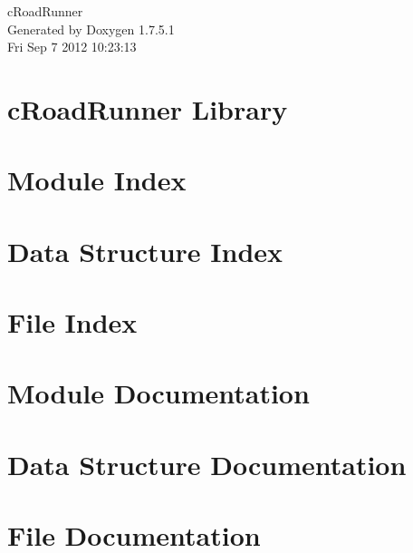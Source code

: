 \documentclass[a4paper]{book}
\begin{document}
\hypersetup{pageanchor=false,citecolor=blue}
\begin{titlepage}
\vspace*{7cm}
\begin{center}
{\Large c\-Road\-Runner }\\
\vspace*{1cm}
{\large \-Generated by Doxygen 1.7.5.1}\\
\vspace*{0.5cm}
{\small Fri Sep 7 2012 10:23:13}\\
\end{center}
\end{titlepage}
\clearemptydoublepage
{}
\tableofcontents
\clearemptydoublepage
{}
\hypersetup{pageanchor=true,citecolor=blue}
\chapter{c\-Road\-Runner \-Library}
\label{index}\hypertarget{index}{}
\chapter{\-Module \-Index}

\chapter{\-Data \-Structure \-Index}

\chapter{\-File \-Index}

\chapter{\-Module \-Documentation}



















\chapter{\-Data \-Structure \-Documentation}










\chapter{\-File \-Documentation}




\printindex
\end{document}
